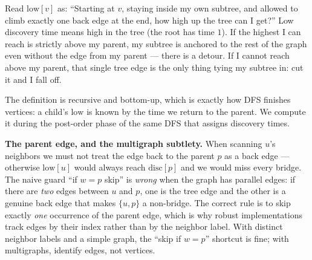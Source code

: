 \begin{intuitionbox}
Read $\mathrm{low}[v]$ as: ``Starting at $v$, staying inside my own subtree, and
allowed to climb exactly one back edge at the end, how high up the tree can I get?''
Low discovery time means high in the tree (the root has time $1$). If the highest I
can reach is strictly above my parent, my subtree is anchored to the rest of the graph
even without the edge from my parent --- there is a detour. If I cannot reach above my
parent, that single tree edge is the only thing tying my subtree in: cut it and I fall
off.
\end{intuitionbox}

The definition is recursive and bottom-up, which is exactly how DFS finishes vertices:
a child's $\mathrm{low}$ is known by the time we return to the parent. We compute it
during the post-order phase of the same DFS that assigns discovery times.

\begin{algorithm}[H]
\caption{\textsc{DFS-LowLink}: discovery times and low-link in one pass}
\label{ch10:alg-lowlink}
\end{algorithm}

\begin{trapbox}
\textbf{The parent edge, and the multigraph subtlety.} When scanning $u$'s neighbors
we must not treat the edge back to the parent $p$ as a back edge --- otherwise
$\mathrm{low}[u]$ would always reach $\mathrm{disc}[p]$ and we would miss every bridge.
The naive guard ``if $w=p$ skip'' is \emph{wrong} when the graph has parallel edges: if
there are \emph{two} edges between $u$ and $p$, one is the tree edge and the other is a
genuine back edge that makes $\{u,p\}$ a non-bridge. The correct rule is to skip
exactly \emph{one} occurrence of the parent edge, which is why robust implementations
track edges by their index rather than by the neighbor label. With distinct neighbor
labels and a simple graph, the ``skip if $w=p$'' shortcut is fine; with multigraphs,
identify edges, not vertices.
\end{trapbox}

